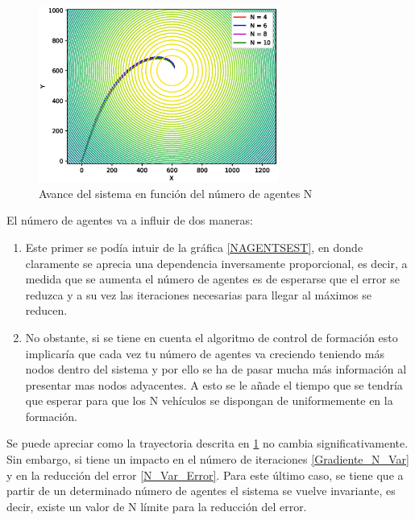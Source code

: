 \begin{figure}[H]
\centering
\includegraphics[width=0.70\textwidth]{figures/N_Var_R_50/Figure_1.eps}
\caption{Avance del sistema en función del número de agentes N} \label{N_Var}
\end{figure}

El número de agentes va a influir de dos maneras: 

\begin{enumerate}
	\item Este primer se podía intuir de la gráfica \ref{NAGENTSEST}, en donde claramente se aprecia una dependencia inversamente proporcional, es decir, a medida que se aumenta el número de agentes es de esperarse que el error se reduzca y a su vez las iteraciones necesarias para llegar al máximos se reducen.
	\item No obstante, si se tiene en cuenta el algoritmo de control de formación esto implicaría que cada vez tu número de agentes va creciendo teniendo más nodos dentro del sistema y por ello se ha de pasar mucha más información al presentar mas nodos adyacentes. A esto se le añade el tiempo que se tendría que esperar para que los N vehículos se dispongan de uniformemente en la formación.
\end{enumerate}

Se puede apreciar como la trayectoria descrita en \ref{N_Var} no cambia significativamente. Sin embargo, si tiene un impacto en el número de iteraciones \ref{Gradiente_N_Var} y en la reducción del error \ref{N_Var_Error}. Para este último caso, se tiene que a partir de un determinado número de agentes el sistema se vuelve invariante, es decir, existe un valor de N límite para la reducción del error.

